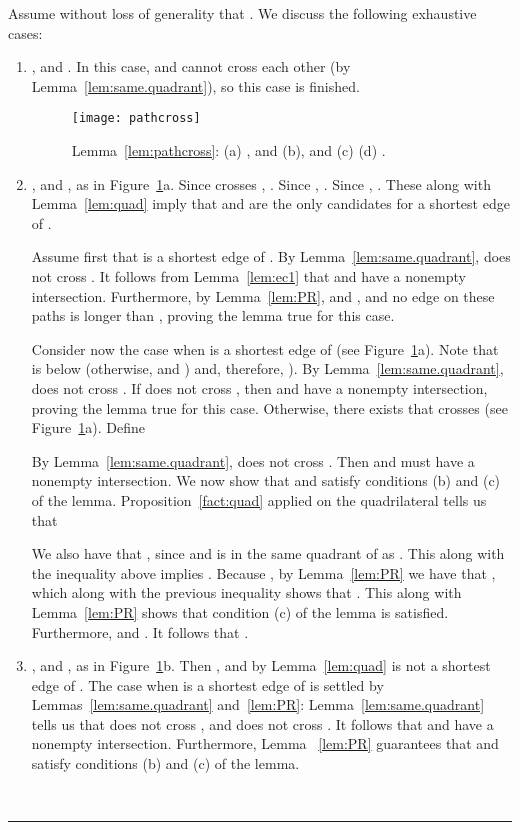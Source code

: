 \pdfoutput=1  \documentclass[11pt]{article}
\newcommand{\qed}{\rule{0.5em}{1.5ex}}
\newcommand{\fqed}{{\hfill~\qed}}
\newenvironment{proof}{{\noindent \bf Proof.}}
                      {{\hfill \fqed} \vspace{1em}}
\begin{document}
\begin{proof}
Assume without loss of generality that .
We discuss the following exhaustive cases:
\begin{enumerate}
\item , and .
In this case,  and  cannot cross each other
(by Lemma~\ref{lem:same.quadrant}), so this case is finished.
\begin{figure}[htbp]
\centering
\texttt{[image: pathcross]}
\caption{Lemma~\ref{lem:pathcross}: (a) , and 
(b), and 
(c)  (d) .}
\label{fig:pathcross}
\end{figure}
\item , and , as in
Figure~\ref{fig:pathcross}a. Since  crosses , .
Since , .
Since , .
These along with Lemma~\ref{lem:quad} imply that  and  are the only
candidates for a shortest edge of .

Assume first that  is a shortest edge of .
By Lemma~\ref{lem:same.quadrant},
 does not cross .
It follows from
Lemma~\ref{lem:ec1}
that  and
 have a nonempty intersection.
Furthermore, by Lemma~\ref{lem:PR},
 and
, and no edge on these paths
is longer than , proving the lemma
true for this case.

Consider now the case when 
is a shortest edge of  (see Figure~\ref{fig:pathcross}a).
Note that  is below  (otherwise,  and
) and, therefore, ).
By Lemma~\ref{lem:same.quadrant}, 
does not cross . If 
does not cross , then  and  have a nonempty intersection,
proving the lemma true for this case.
Otherwise, there exists 
that crosses  (see Figure~\ref{fig:pathcross}a). Define

By Lemma~\ref{lem:same.quadrant},  does not cross .
Then  and  must have a nonempty intersection.
We now show that  and  satisfy conditions (b) and (c) of the lemma.
Proposition~\ref{fact:quad}
applied on the quadrilateral  tells us that

We also have that , since  and  is
in the same quadrant of  as . This along with the inequality above implies
. Because , by Lemma~\ref{lem:PR} we
have that , which along with the previous inequality shows that
.
This along with Lemma~\ref{lem:PR} shows that condition (c) of the lemma
is satisfied. Furthermore,
 and
.
It follows that .

\item , and , as in Figure~\ref{fig:pathcross}b.
Then , and by Lemma~\ref{lem:quad}  is not
a shortest edge of .
The case when  is a shortest edge of  is settled by
Lemmas~\ref{lem:same.quadrant} and~\ref{lem:PR}: Lemma~\ref{lem:same.quadrant}
tells us that  does not cross , and
 does not cross . It follows that  and
 have a nonempty intersection. Furthermore, Lemma ~\ref{lem:PR} guarantees
that  and  satisfy conditions (b) and (c) of the lemma.


\end{enumerate}
\end{proof}
\end{document}
